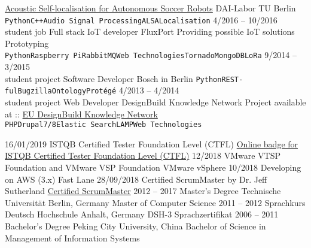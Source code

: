 \documentclass[9pt]{developercv} %
\begin{document}
\begin{entrylist}
		{\href{http://dainamite.github.io/public/publication/yang_master_thesis.pdf}{Acoustic Self-localisation for Autonomous Soccer Robots}}
		{DAI-Labor TU Berlin}
		{\texttt{Python}\slashsep\texttt{C++}\slashsep\texttt{Audio Signal Processing}\slashsep\texttt{ALSA}\slashsep\texttt{Localisation}}
	\entry
		{4/2016 -- 10/2016\\\footnotesize{student job}}
		{Full stack IoT developer}
		{FluxPort}
		{Providing possible IoT solutions\\Prototyping\\ \texttt{Python}\slashsep\texttt{Raspberry Pi}\slashsep\texttt{RabbitMQ}\slashsep\texttt{Web Technologies}\slashsep\texttt{Tornado}\slashsep\texttt{MongoDB}\slashsep\texttt{LoRa}}
	\entry
		{9/2014 -- 3/2015\\\footnotesize{student project}}
		{Software Developer}
		{Bosch in Berlin}
		{\texttt{Python}\slashsep\texttt{REST-ful}\slashsep\texttt{Bugzilla}\slashsep\texttt{Ontology}\slashsep\texttt{Prot{\'e}g{\'e}}}
	\entry
		{4/2013 -- 4/2014\\\footnotesize{student project}}
		{Web Developer}
		{DesignBuild Knowledge Network}
		{Project available at :: \href{https://www.dbxchange.eu/}{EU DesignBuild Knowledge Network} \\\texttt{PHP}\slashsep\texttt{Drupal7/8}\slashsep\texttt{Elastic Search}\slashsep\texttt{LAMP}\slashsep\texttt{Web Technologies}}
\end{entrylist}



\begin{entrylist}
	\entry
		{16/01/2019}
		{ISTQB Certified Tester Foundation Level (CTFL)}
		{}
		{\href{https://www.youracclaim.com/badges/57851f58-8218-4f79-bac4-b2a6fb6a5d94}{Online badge for ISTQB Certified Tester Foundation Level (CTFL)}}
	\entry
		{12/2018}
		{VMware VTSP Foundation and VMware VSP Foundation}
		{VMware vSphere }
		{}
	\entry
		{10/2018}
		{Developing on AWS (3.x)}
		{Fast Lane}
		{}
	\entry
		{28/09/2018}
		{Certified ScrumMaster}
		{by Dr. Jeff Sutherland}
		{\href{https://www.scrumalliance.org/community/profile/wyang35}{Certified ScrumMaster}}
	\entry
		{2012 -- 2017}
		{Master's Degree}
		{Technische Universit{\"a}t Berlin, Germany }
		{Master of Computer Science}
	\entry
		{2011 -- 2012}
		{Sprachkurs Deutsch}
		{Hochschule Anhalt, Germany}
		{DSH-3 Sprachzertifikat}
	\entry
		{2006 -- 2011}
		{Bachelor's Degree}
		{Peking City University, China}
		{Bachelor of Science in Management of Information Systems }
\end{entrylist}
\clearpage
\end{document}
